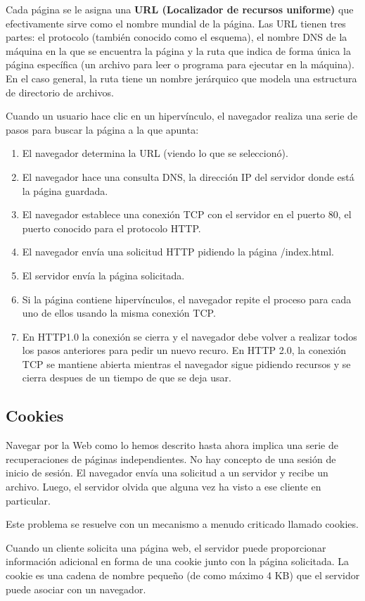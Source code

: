 Cada página se le asigna una \textbf{URL (Localizador de recursos uniforme)} que efectivamente sirve como el nombre mundial de la página. Las URL tienen tres partes: el protocolo (también conocido como el esquema), el nombre DNS de la máquina en la que se encuentra la página y la ruta que indica de forma única la página específica (un archivo para leer o programa para ejecutar en la máquina). En el caso general, la ruta tiene un nombre jerárquico que modela una estructura de directorio de archivos.

Cuando un usuario hace clic en un hipervínculo, el navegador realiza una serie de pasos para buscar la página a la que apunta:
\begin{enumerate}
  \item El navegador determina la URL (viendo lo que se seleccionó).
  \item El navegador hace una consulta DNS, la dirección IP del servidor donde está la página guardada.
  \item El navegador establece una conexión TCP con el servidor en el puerto 80, el puerto conocido para el protocolo HTTP.
  \item El navegador envía una solicitud HTTP pidiendo la página /index.html.
  \item El servidor envía la página solicitada.
  \item Si la página contiene hipervínculos, el navegador repite el proceso para cada uno de ellos usando la misma conexión TCP.
  \item En HTTP1.0 la conexión se cierra y el navegador debe volver a realizar todos los pasos anteriores para pedir un nuevo recuro. En HTTP 2.0, la conexión TCP se mantiene abierta mientras el navegador sigue pidiendo recursos y se cierra despues de un tiempo de que se deja usar.
\end{enumerate}

\subsection{Cookies}
Navegar por la Web como lo hemos descrito hasta ahora implica una serie de recuperaciones de páginas independientes. No hay concepto de una sesión de inicio de sesión. El navegador envía una solicitud a un servidor y recibe un archivo. Luego, el servidor olvida que alguna vez ha visto a ese cliente en particular.

Este problema se resuelve con un mecanismo a menudo criticado llamado cookies.

Cuando un cliente solicita una página web, el servidor puede proporcionar información adicional en forma de una cookie junto con la página solicitada. La cookie es una cadena de nombre pequeño (de como máximo 4 KB) que el servidor puede asociar con un navegador.

